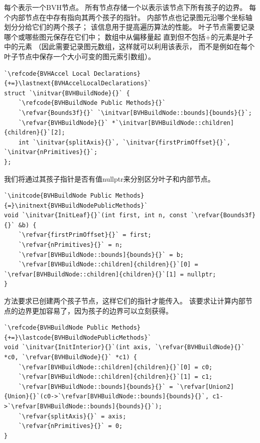每个表示一个BVH节点。
所有节点存储一个以表示该节点下所有孩子的边界。
每个内部节点在中存有指向其两个孩子的指针。
内部节点也记录图元沿哪个坐标轴划分分给它们的两个孩子；
该信息用于提高遍历算法的性能。
叶子节点需要记录哪个或哪些图元保存在它们中；
数组中从偏移量起
直到但不包括{\ttfamily{}+}的元素是叶子中的元素
（因此需要记录图元数组，这样就可以利用该表示，
而不是例如在每个叶子节点中保存一个大小可变的图元索引数组）。
\begin{lstlisting}
`\refcode{BVHAccel Local Declarations}{+=}\lastnext{BVHAccelLocalDeclarations}`
struct `\initvar{BVHBuildNode}{}` {
    `\refcode{BVHBuildNode Public Methods}{}`
    `\refvar{Bounds3f}{}` `\initvar[BVHBuildNode::bounds]{bounds}{}`;
    `\refvar{BVHBuildNode}{}` *`\initvar[BVHBuildNode::children]{children}{}`[2];
    int `\initvar{splitAxis}{}`, `\initvar{firstPrimOffset}{}`, `\initvar{nPrimitives}{}`;
};
\end{lstlisting}

我们将通过其孩子指针是否有值{\ttfamily nullptr}来分别区分叶子和内部节点。
\begin{lstlisting}
`\initcode{BVHBuildNode Public Methods}{=}\initnext{BVHBuildNodePublicMethods}`
void `\initvar{InitLeaf}{}`(int first, int n, const `\refvar{Bounds3f}{}` &b) {
    `\refvar{firstPrimOffset}{}` = first;
    `\refvar{nPrimitives}{}` = n;
    `\refvar[BVHBuildNode::bounds]{bounds}{}` = b;
    `\refvar[BVHBuildNode::children]{children}{}`[0] = `\refvar[BVHBuildNode::children]{children}{}`[1] = nullptr;
}
\end{lstlisting}

方法要求已创建两个孩子节点，这样它们的指针才能传入。
该要求让计算内部节点的边界更加容易了，因为孩子的边界可以立刻获得。
\begin{lstlisting}
`\refcode{BVHBuildNode Public Methods}{+=}\lastcode{BVHBuildNodePublicMethods}`
void `\initvar{InitInterior}{}`(int axis, `\refvar{BVHBuildNode}{}` *c0, `\refvar{BVHBuildNode}{}` *c1) {
    `\refvar[BVHBuildNode::children]{children}{}`[0] = c0;
    `\refvar[BVHBuildNode::children]{children}{}`[1] = c1;
    `\refvar[BVHBuildNode::bounds]{bounds}{}` = `\refvar[Union2]{Union}{}`(c0->`\refvar[BVHBuildNode::bounds]{bounds}{}`, c1->`\refvar[BVHBuildNode::bounds]{bounds}{}`);
    `\refvar{splitAxis}{}` = axis;
    `\refvar{nPrimitives}{}` = 0;
}
\end{lstlisting}

